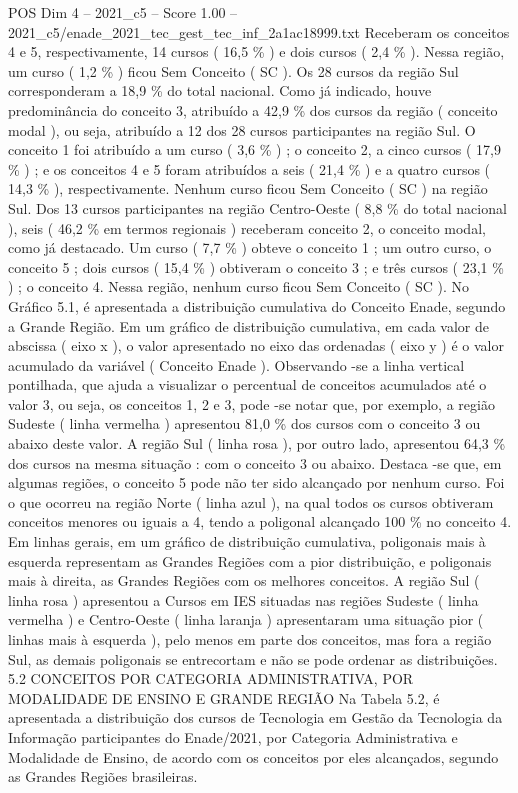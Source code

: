 \begin{textsample}{POS Dim 4 – 2021\_c5 – Score 1.00 – 2021\_c5/enade\_2021\_tec\_gest\_tec\_inf\_2a1ac18999.txt}
Receberam os conceitos 4 e 5, respectivamente, 14 cursos ( 16,5 \% ) e dois cursos ( 2,4 \% ).
Nessa região, um curso ( 1,2 \% ) ficou Sem Conceito ( SC ).
Os 28 cursos da região Sul corresponderam a 18,9 \% do total nacional.
Como já indicado, houve predominância do conceito 3, atribuído a 42,9 \% dos cursos da região ( conceito modal ), ou seja, atribuído a 12 dos 28 cursos participantes na região Sul.
O conceito 1 foi atribuído a um curso ( 3,6 \% ) ; o conceito 2, a cinco cursos ( 17,9 \% ) ; e os conceitos 4 e 5 foram atribuídos a seis ( 21,4 \% ) e a quatro cursos ( 14,3 \% ), respectivamente.
Nenhum curso ficou Sem Conceito ( SC ) na região Sul.
Dos 13 cursos participantes na região Centro-Oeste ( 8,8 \% do total nacional ), seis ( 46,2 \% em termos regionais ) receberam conceito 2, o conceito modal, como já destacado.
Um curso ( 7,7 \% ) obteve o conceito 1 ; um outro curso, o conceito 5 ; dois cursos ( 15,4 \% ) obtiveram o conceito 3 ; e três cursos ( 23,1 \% ) ; o conceito 4.
Nessa região, nenhum curso ficou Sem Conceito ( SC ).
No Gráfico 5.1, é apresentada a distribuição cumulativa do Conceito Enade, segundo a Grande Região.
Em um gráfico de distribuição cumulativa, em cada valor de abscissa ( eixo x ), o valor apresentado no eixo das ordenadas ( eixo y ) é o valor acumulado da variável ( Conceito Enade ).
Observando -se a linha vertical pontilhada, que ajuda a visualizar o percentual de conceitos acumulados até o valor 3, ou seja, os conceitos 1, 2 e 3, pode -se notar que, por exemplo, a região Sudeste ( linha vermelha ) apresentou 81,0 \% dos cursos com o conceito 3 ou abaixo deste valor.
A região Sul ( linha rosa ), por outro lado, apresentou 64,3 \% dos cursos na mesma situação : com o conceito 3 ou abaixo.
Destaca -se que, em algumas regiões, o conceito 5 pode não ter sido alcançado por nenhum curso.
Foi o que ocorreu na região Norte ( linha azul ), na qual todos os cursos obtiveram conceitos menores ou iguais a 4, tendo a poligonal alcançado 100 \% no conceito 4.
Em linhas gerais, em um gráfico de distribuição cumulativa, poligonais mais à esquerda representam as Grandes Regiões com a pior distribuição, e poligonais mais à direita, as Grandes Regiões com os melhores conceitos.
A região Sul ( linha rosa ) apresentou a Cursos em IES situadas nas regiões Sudeste ( linha vermelha ) e Centro-Oeste ( linha laranja ) apresentaram uma situação pior ( linhas mais à esquerda ), pelo menos em parte dos conceitos, mas fora a região Sul, as demais poligonais se entrecortam e não se pode ordenar as distribuições. 5.2 CONCEITOS POR CATEGORIA ADMINISTRATIVA, POR MODALIDADE DE ENSINO E GRANDE REGIÃO Na Tabela 5.2, é apresentada a distribuição dos cursos de Tecnologia em Gestão da Tecnologia da Informação participantes do Enade/2021, por Categoria Administrativa e Modalidade de Ensino, de acordo com os conceitos por eles alcançados, segundo as Grandes Regiões brasileiras.

\end{textsample}
